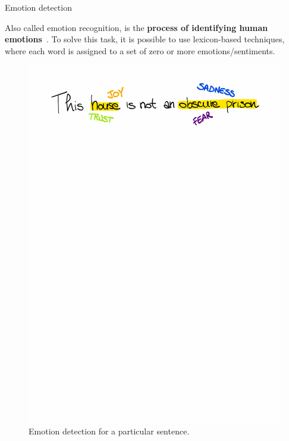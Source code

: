\documentclass[8pt]{beamer}  %
\begin{document}
\begin{frame}{Emotion detection}

    Also called emotion recognition, is the \textbf{process of identifying human emotions}~\autocite{enwiki:1023798177}. To solve this task, it is possible to use lexicon-based techniques, where each word is assigned to a set of zero or more emotions/sentiments.

    \begin{figure}[H]
    	\centering
    	\includegraphics[scale=.45,trim= 0 700 0 30, clip]{assets/img/emotion_detection_example.pdf}
    	\caption{Emotion detection for a particular sentence.}
    	\label{fig:emotion-detection-example}
    \end{figure}

\end{frame}
\end{document}

